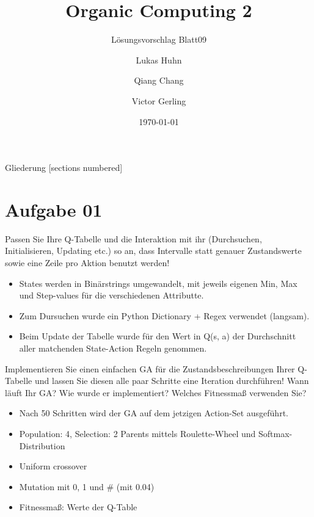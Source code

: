 \documentclass{ocbeameruni}
\title{Organic Computing 2}
\subtitle{Lösungsvorschlag Blatt09}
\date{\today}
\author{Lukas Huhn \and Qiang Chang \and Victor Gerling}
\institute{%
  Universität Augsburg\\
  Institut für Informatik\\
  Lehrstuhl für Organic Computing
}
\begin{document}
\maketitle


\begin{frame}{Gliederung}
  [sections numbered]
  \tableofcontents
\end{frame}


\section{Aufgabe 01}

\begin{frame}{1.1}
Passen Sie Ihre Q-Tabelle und die Interaktion mit ihr (Durchsuchen, Initialisieren, Updating
etc.) so an, dass Intervalle statt genauer Zustandswerte sowie eine Zeile pro Aktion benutzt
werden!
    \begin{itemize}
    \item States werden in Binärstrings umgewandelt, mit jeweils eigenen Min, Max und Step-values für die verschiedenen Attributte.
    \item Zum Dursuchen wurde ein Python Dictionary + Regex verwendet (langsam).
    \item Beim Update der Tabelle wurde für den Wert in Q(s, a) der Durchschnitt aller matchenden State-Action Regeln genommen. 
    \end{itemize}
\end{frame}

\begin{frame}{1.2}
Implementieren Sie einen einfachen GA für die Zustandsbeschreibungen Ihrer Q-Tabelle und
lassen Sie diesen alle paar Schritte eine Iteration durchführen! Wann läuft Ihr GA? Wie wurde
er implementiert? Welches Fitnessmaß verwenden Sie?
    \begin{itemize}
    \item Nach 50 Schritten wird der GA auf dem jetzigen Action-Set ausgeführt. 
    \item Population: 4, Selection: 2 Parents mittels Roulette-Wheel und Softmax-Distribution
    \item Uniform crossover
    \item Mutation mit 0, 1 und # (mit 0.04)
    \item Fitnessmaß: Werte der Q-Table
    \end{itemize}
\end{frame}
\end{document}
